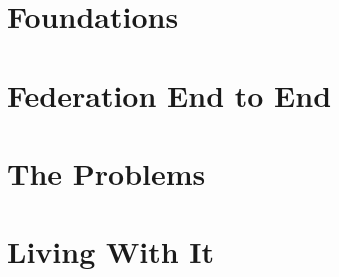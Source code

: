 \documentclass[11pt,a4paper,twoside,openright]{book}
\begin{document}
\frontmatter


\tableofcontents


\mainmatter

\part{Foundations}





\part{Federation End to End}






\part{The Problems}










\part{Living With It}



\appendix






\backmatter
\printbibliography[heading=bibintoc]
\printindex
\end{document}
